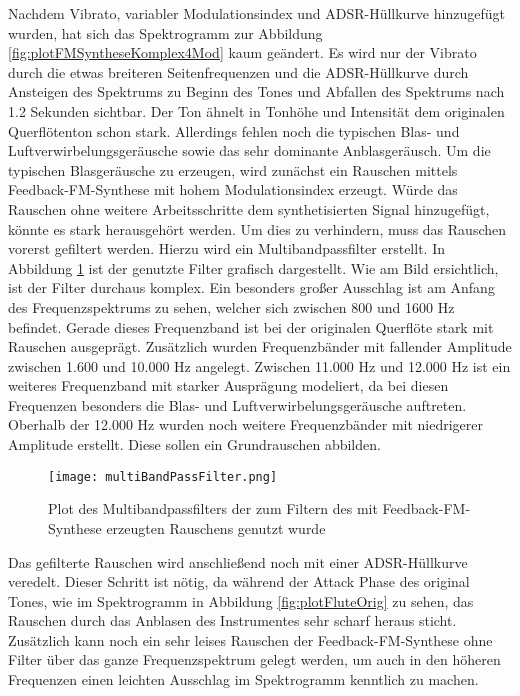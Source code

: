 Nachdem Vibrato, variabler Modulationsindex und ADSR-Hüllkurve hinzugefügt wurden, hat sich das Spektrogramm zur Abbildung \ref{fig:plotFMSyntheseKomplex4Mod} kaum geändert. Es wird nur der Vibrato durch die etwas breiteren Seitenfrequenzen und die ADSR-Hüllkurve durch Ansteigen des Spektrums zu Beginn des Tones und Abfallen des Spektrums nach 1.2 Sekunden sichtbar. Der Ton ähnelt in Tonhöhe und Intensität dem originalen Querflötenton schon stark. Allerdings fehlen noch die typischen Blas- und Luftverwirbelungsgeräusche sowie das sehr dominante Anblasgeräusch. Um die typischen Blasgeräusche zu erzeugen, wird zunächst ein Rauschen mittels Feedback-FM-Synthese mit hohem Modulationsindex erzeugt. Würde das Rauschen ohne weitere Arbeitsschritte dem synthetisierten Signal hinzugefügt, könnte es stark herausgehört werden. Um dies zu verhindern, muss das Rauschen vorerst gefiltert werden. Hierzu wird ein Multibandpassfilter erstellt. In Abbildung \ref{fig:multiBandPassFilter} ist der genutzte Filter grafisch dargestellt. Wie am Bild ersichtlich, ist der Filter durchaus komplex. Ein besonders großer Ausschlag ist am Anfang des Frequenzspektrums zu sehen, welcher sich zwischen 800 und 1600 Hz befindet. Gerade dieses Frequenzband ist bei der originalen Querflöte stark mit Rauschen ausgeprägt. Zusätzlich wurden Frequenzbänder mit fallender Amplitude zwischen 1.600 und 10.000 Hz angelegt. Zwischen 11.000 Hz und 12.000 Hz ist ein weiteres Frequenzband mit starker Ausprägung modeliert, da bei diesen Frequenzen besonders die Blas- und Luftverwirbelungsgeräusche auftreten. Oberhalb der 12.000 Hz wurden noch weitere Frequenzbänder mit niedrigerer Amplitude erstellt. Diese sollen ein Grundrauschen abbilden.

\begin{figure} [h!t!b!]
\centering
  \texttt{[image: multiBandPassFilter.png]}
\caption{Plot des Multibandpassfilters der zum Filtern des mit Feedback-FM-Synthese erzeugten Rauschens genutzt wurde}
\label{fig:multiBandPassFilter}
\end{figure}

Das gefilterte Rauschen wird anschließend noch mit einer ADSR-Hüllkurve veredelt. Dieser Schritt ist nötig, da während der Attack Phase des original Tones, wie im Spektrogramm in Abbildung \ref{fig:plotFluteOrig} zu sehen, das Rauschen durch das Anblasen des Instrumentes sehr scharf heraus sticht. Zusätzlich kann noch ein sehr leises Rauschen der Feedback-FM-Synthese ohne Filter über das ganze Frequenzspektrum gelegt werden, um auch in den höheren Frequenzen einen leichten Ausschlag im Spektrogramm kenntlich zu machen. 

